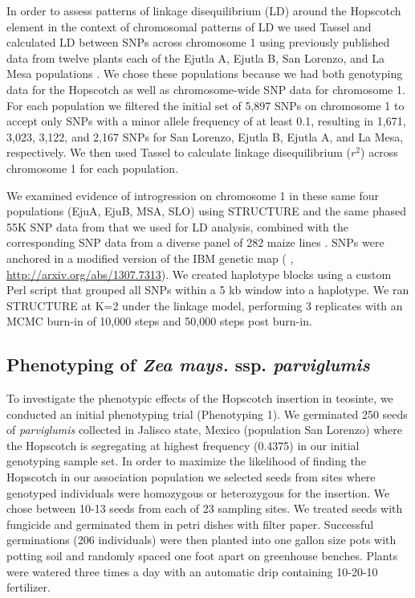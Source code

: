 \documentclass[12pt]{article}
\begin{document}
In order to assess patterns of linkage disequilibrium (LD) around the Hopscotch element in the context of chromosomal patterns of LD we used Tassel \cite{Bradbury et al 2007} and calculated LD between SNPs across chromosome 1 using previously published data from twelve plants each of the Ejutla A, Ejutla B, San Lorenzo, and La Mesa populations \cite{Pyhajarvi et al 2013}. We chose these populations because we had both genotyping data for the Hopscotch as well as chromosome-wide SNP data for chromosome 1. For each population we filtered the initial set of 5,897 SNPs on chromosome 1 to accept only SNPs with a minor allele frequency of at least 0.1, resulting in 1,671, 3,023, 3,122, and 2,167 SNPs for San Lorenzo, Ejutla B, Ejutla A, and La Mesa, respectively. We then used Tassel \cite{Bradbury et al 2007} to calculate linkage disequilibrium ($r^{2}$) across chromosome 1 for each population. 

We examined evidence of introgression on chromosome 1 in these same four populations (EjuA, EjuB, MSA, SLO) using STRUCTURE \cite{Falush et al 2003} and the same phased 55K SNP data from \cite{Pyhajarvi et al 2013} that we used for LD analysis, combined with the corresponding SNP data from a diverse panel of 282 maize lines \cite{Cook et al 2012}. SNPs were anchored in a modified version of the IBM genetic map ( \cite{Gerke et al 2013}, \url{http://arxiv.org/abs/1307.7313}). We created haplotype blocks using a custom Perl script that grouped all SNPs within a 5 kb window into a haplotype. We ran STRUCTURE at K=2 under the linkage model, performing 3 replicates with an MCMC burn-in of 10,000 steps and 50,000 steps post burn-in. 

\subsection{Phenotyping of \emph{Zea mays.} ssp. \emph{parviglumis}}

To investigate the phenotypic effects of the Hopscotch insertion in teosinte, we conducted an initial phenotyping trial (Phenotyping 1). We germinated 250 seeds of \emph{parviglumis} collected in Jalisco state, Mexico (population San Lorenzo) \cite{Hufford 2010} where the Hopscotch is segregating at highest frequency (0.4375) in our initial genotyping sample set. In order to maximize the likelihood of finding the Hopscotch in our association population we selected seeds from sites where genotyped individuals were homozygous or heterozygous for the insertion. We chose between 10-13 seeds from each of 23 sampling sites. We treated seeds with fungicide and germinated them in petri dishes with filter paper. Successful germinations (206 individuals) were then planted into one gallon size pots with potting soil and randomly spaced one foot apart on greenhouse benches. Plants were watered three times a day with an automatic drip containing 10-20-10 fertilizer. 
\end{document}
